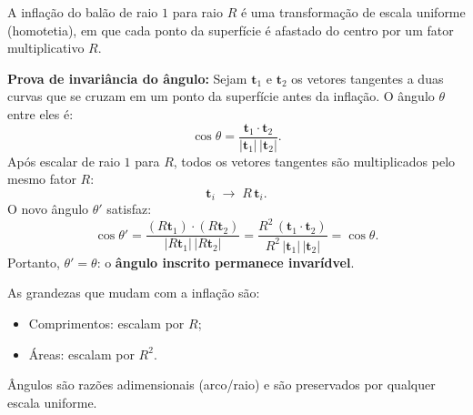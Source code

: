 A inflação do balão de raio $1$ para raio $R$ é uma transformação de escala uniforme (homotetia), em que cada ponto da superfície é afastado do centro por um fator multiplicativo $R$.

\textbf{Prova de invariância do ângulo:}
Sejam $\mathbf{t}_1$ e $\mathbf{t}_2$ os vetores tangentes a duas curvas que se cruzam em um ponto da superfície antes da inflação. O ângulo $\theta$ entre eles é:
\[
\cos\theta = \frac{\mathbf{t}_1\cdot\mathbf{t}_2}{|\mathbf{t}_1|\,|\mathbf{t}_2|}.
\]
Após escalar de raio $1$ para $R$, todos os vetores tangentes são multiplicados pelo mesmo fator $R$:
\[
\mathbf{t}_i \;\to\; R\,\mathbf{t}_i.
\]
O novo ângulo $\theta'$ satisfaz:
\[
\cos\theta' = \frac{(R\mathbf{t}_1)\cdot(R\mathbf{t}_2)}{|R\mathbf{t}_1|\,|R\mathbf{t}_2|} = \frac{R^2\,(\mathbf{t}_1\cdot\mathbf{t}_2)}{R^2\,|\mathbf{t}_1|\,|\mathbf{t}_2|} = \cos\theta.
\]
Portanto, $\theta' = \theta$: o \textbf{ângulo inscrito permanece invarídvel}.

As grandezas que mudam com a inflação são:
\begin{itemize}
\item Comprimentos: escalam por $R$;
\item Áreas: escalam por $R^2$.
\end{itemize}
Ângulos são razões adimensionais (arco/raio) e são preservados por qualquer escala uniforme.

